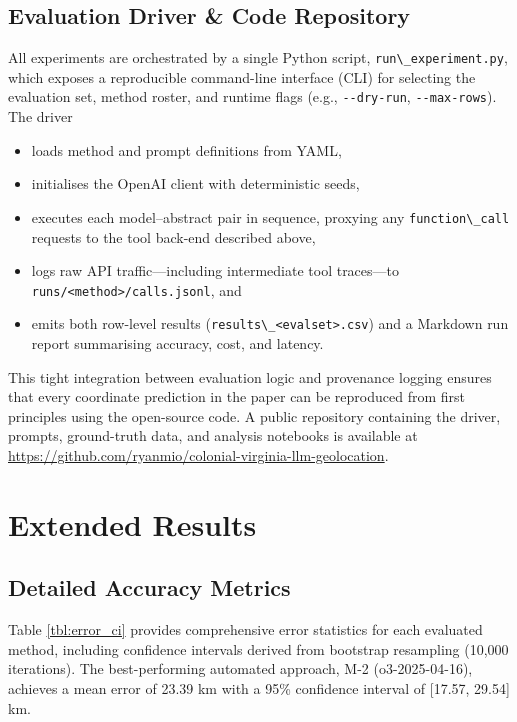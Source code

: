 \subsection{Evaluation Driver \& Code
Repository}\label{a.5-evaluation-driver-code-repository}

All experiments are orchestrated by a single Python script,
\passthrough{\lstinline!run\_experiment.py!}, which exposes a
reproducible command-line interface (CLI) for selecting the evaluation
set, method roster, and runtime flags (e.g.,
\passthrough{\lstinline!--dry-run!},
\passthrough{\lstinline!--max-rows!}). The driver

\begin{itemize}
\tightlist
\item
  loads method and prompt definitions from YAML,
\item
  initialises the OpenAI client with deterministic seeds,
\item
  executes each model--abstract pair in sequence, proxying any
  \passthrough{\lstinline!function\_call!} requests to the tool back-end
  described above,
\item
  logs raw API traffic---including intermediate tool traces---to
  \passthrough{\lstinline!runs/<method>/calls.jsonl!}, and
\item
  emits both row-level results
  (\passthrough{\lstinline!results\_<evalset>.csv!}) and a Markdown run
  report summarising accuracy, cost, and latency.
\end{itemize}

This tight integration between evaluation logic and provenance logging
ensures that every coordinate prediction in the paper can be reproduced
from first principles using the open-source code. A public repository
containing the driver, prompts, ground-truth data, and analysis
notebooks is available at
\url{https://github.com/ryanmio/colonial-virginia-llm-geolocation}.

\section{Extended
Results}\label{appendix-b-extended-results}

\subsection{Detailed Accuracy
Metrics}\label{b.1-detailed-accuracy-metrics}

Table \ref{tbl:error_ci} provides comprehensive error statistics for
each evaluated method, including confidence intervals derived from
bootstrap resampling (10,000 iterations). The best-performing automated
approach, M-2 (o3-2025-04-16), achieves a mean error of 23.39 km with a
95\% confidence interval of {[}17.57, 29.54{]} km.

